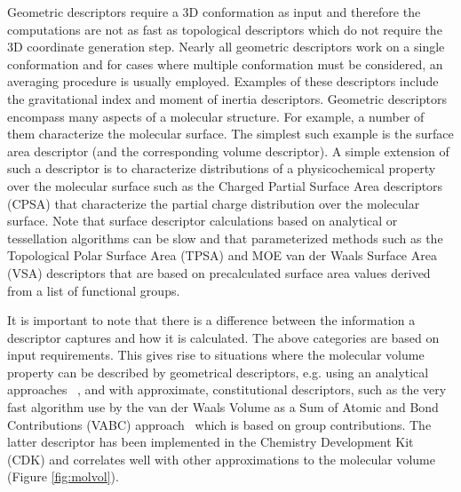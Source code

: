 \documentclass[letterpaper, 12pt]{article}
\begin{document}
Geometric descriptors require a 3D conformation as input and therefore
the computations are not as fast as topological descriptors which do
not require the 3D coordinate generation step. Nearly all geometric
descriptors work on a single conformation and for cases where multiple
conformation must be considered, an averaging procedure is usually
employed. Examples of these descriptors include the gravitational
index \cite{Katritzky:1996ly} and moment of inertia descriptors.
Geometric descriptors encompass many aspects of a molecular
structure. For example, a number of them characterize the molecular
surface. The simplest such example is the surface area descriptor (and
the corresponding volume descriptor). A simple extension of such a
descriptor is to characterize distributions of a physicochemical
property over the molecular surface such as the Charged Partial
Surface Area descriptors (CPSA) \cite{Stanton:1990aa} that
characterize the partial charge distribution over the molecular
surface. Note that surface descriptor calculations based on analytical
\cite{Connolly:1983aa} or tessellation algorithms
\cite{Eisenhaber:1995qf} can be slow and that parameterized methods
such as the Topological Polar Surface Area (TPSA) \cite{Ertl:2000aa}
and MOE van der Waals Surface Area (VSA) descriptors
\cite{Labute:2008aa} that are based on precalculated surface area
values derived from a list of functional groups.

It is important to note that there is a difference between the
information a descriptor captures and how it is calculated. The above
categories are based on input requirements. This gives rise to
situations where the molecular volume property can be described by
geometrical descriptors, e.g. using an analytical approaches
~\cite{Eisenhaber:1995qf}, and with approximate, constitutional
descriptors, such as the very fast algorithm use by the van der Waals
Volume as a Sum of Atomic and Bond Contributions (VABC)
approach~\cite{Zhao:2003fk} which is based on group contributions.
The latter descriptor has been implemented in the Chemistry
Development Kit (CDK) and correlates well with other approximations to
the molecular volume (Figure \ref{fig:molvol}).
\end{document}
